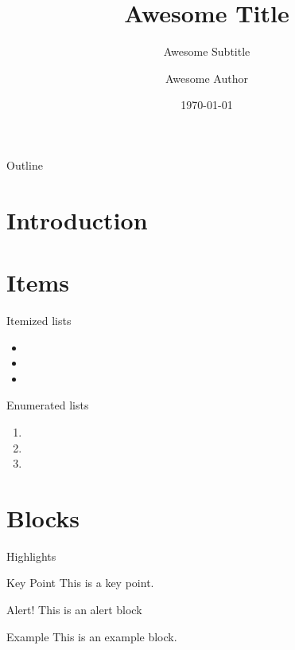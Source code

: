 \documentclass[aspectratio=1609]{beamer}
\title{Awesome Title}
\subtitle{Awesome Subtitle}
\author{Awesome Author}
\date{\today}
\begin{document}
\titlepage

\begin{frame}{Outline}
  \tableofcontents
\end{frame}

\section{Introduction}

\begin{frame}
  \lipsum[1][1-8]
\end{frame}

\begin{frame}
  \lipsum[2][1-8]
\end{frame}

\section{Items}
\begin{frame}{Itemized lists}
  \begin{itemize}
    \item \lipsum[2][1]
    \item \lipsum[4][1]
    \item \lipsum[6][1]
  \end{itemize}
\end{frame}

\begin{frame}{Enumerated lists}
  \begin{enumerate}
    \item \lipsum[3][2]
    \item \lipsum[5][2]
    \item \lipsum[7][2]
 \end{enumerate}
\end{frame}

\section{Blocks}
\begin{frame}{Highlights}
  \begin{block}{Key Point}
    This is a key point.
  \end{block}
  \begin{alertblock}{Alert!}
    This is an alert block
  \end{alertblock}
  \begin{exampleblock}{Example}
    This is an example block.
  \end{exampleblock}
\end{frame}

\closingpage
\end{document}
